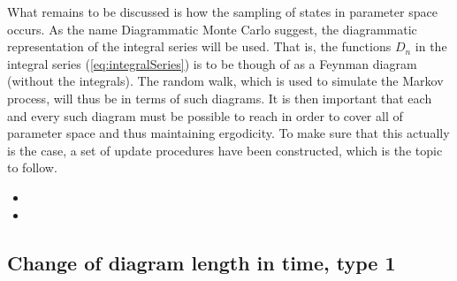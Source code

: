 What remains to be discussed is how the sampling of states in parameter space occurs. As the name Diagrammatic Monte Carlo suggest, the diagrammatic representation of the integral series will be used. That is, the functions $ D_n $ in the integral series (\ref{eq:integralSeries}) is to be though of as a Feynman diagram (without the integrals). The random walk, which is used to simulate the Markov process, will thus be in terms of such diagrams. It is then important that each and every such diagram must be possible to reach in order to cover all of parameter space and thus maintaining ergodicity. To make sure that this actually is the case, a set of update procedures \cite{MishchenkoA.2000DqMC} have been constructed, which is the topic to follow.

\begin{itemize}
	\item {}

	\item {}
\end{itemize}

\subsection*{Change of diagram length in time, type 1}


